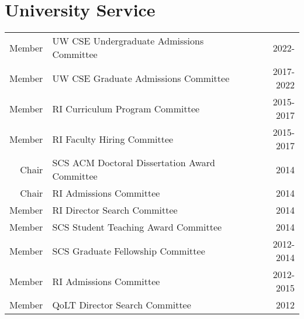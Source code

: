 \section{University Service}
\begin{tabularx}{\linewidth}{rXr}
Member & UW CSE Undergraduate Admissions Committee & 2022-\phantom{2025} \\
Member & UW CSE Graduate Admissions Committee & 2017-2022 \\
Member & RI Curriculum Program Committee & 2015-2017\\
Member & RI Faculty Hiring Committee & 2015-2017\\
Chair & SCS ACM Doctoral Dissertation Award Committee & 2014\\
Chair & RI Admissions Committee & 2014 \\
Member & RI Director Search Committee & 2014 \\
Member & SCS Student Teaching Award Committee & 2014 \\
Member & SCS Graduate Fellowship Committee & 2012-2014 \\
Member & RI Admissions Committee & 2012-2015 \\
Member & QoLT Director Search Committee & 2012\\
\end{tabularx}
